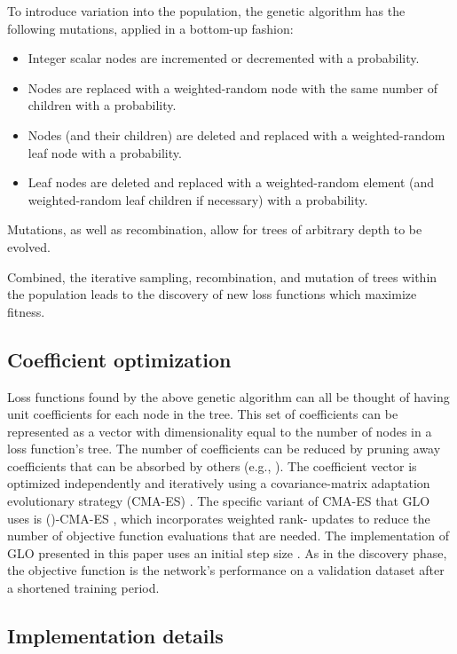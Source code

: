 \documentclass[conference]{IEEEtran}
\begin{document}
To introduce variation into the population, the genetic algorithm has the following mutations, applied in a bottom-up fashion:
\begin{itemize}[noitemsep,nosep]
\item Integer scalar nodes are incremented or decremented with a  probability.
\item Nodes are replaced with a weighted-random node with the same number of children with a  probability.
\item Nodes (and their children) are deleted and replaced with a weighted-random leaf node with a  probability.
\item Leaf nodes are deleted and replaced with a weighted-random element (and weighted-random leaf children if necessary) with a  probability.
\end{itemize}
Mutations, as well as recombination, allow for trees of arbitrary depth to be evolved.

Combined, the iterative sampling, recombination, and mutation of trees within the population leads to the discovery of new loss functions which maximize fitness. 

\subsection{Coefficient optimization}

Loss functions found by the above genetic algorithm can all be thought of having unit coefficients for each node in the tree. This set of coefficients can be represented as a vector with dimensionality equal to the number of nodes in a loss function's tree. The number of coefficients can be reduced by pruning away coefficients that can be absorbed by others (e.g., ). The coefficient vector is optimized independently and iteratively using a covariance-matrix adaptation evolutionary strategy (CMA-ES) \cite{hansen1996cmaes}. The specific variant of CMA-ES that GLO uses is ()-CMA-ES \cite{hansen2001cmaesmumulambda}, which incorporates weighted rank- updates \cite{hansen2004weightedrankmucmaes} to reduce the number of objective function evaluations that are needed. The implementation of GLO presented in this paper uses an initial step size . As in the discovery phase, the objective function is the network's performance on a validation dataset after a shortened training period.

\subsection{Implementation details}
\end{document}
